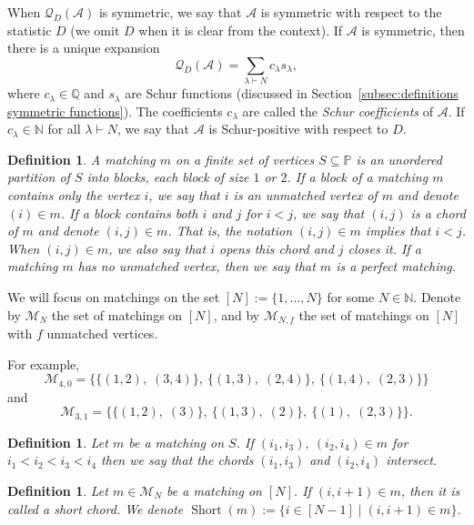 \documentclass[11pt]{article}
\newtheorem{definition}[theo]{Definition}
\theoremstyle{definition}
\numberwithin{equation}{section}
\newcommand{\Short}{\operatorname{Short}}
\newcommand{\NN}{\mathbb{N}}
\newcommand{\QQ}{\mathbb{Q}}
\newcommand{\PP}{\mathbb{P}}
\newcommand{\Q}{\mathcal{Q}}
\newcommand{\A}{\mathcal{A}}
\newcommand{\M}{\mathcal{M}}
\begin{document}
When $\Q_{D}(\A)$ is symmetric, we say that $\A$ is symmetric with respect to the statistic $D$ (we omit $D$ when it is clear from the context). If $\A$ is symmetric, then there is a unique expansion
\[
    \Q_{D} (\A) = \sum_{\lambda \vdash N} c_\lambda s_\lambda,
\]
where $c_\lambda \in \QQ$ and $s_\lambda$ are Schur functions (discussed in Section~\ref{subsec:definitions symmetric functions}). The coefficients $c_\lambda$ are called the \emph{Schur coefficients} of $\A$.
If $c_\lambda \in \NN$ for all $\lambda \vdash N$, we say that $\A$ is Schur-positive with respect to $D$.

\begin{definition}
\label{def:matching}
    A matching $m$ on a finite set of vertices $S \subseteq \PP$ is an unordered partition of $S$ into blocks, each block of size $1$ or $2$. If a block of a matching $m$ contains only the vertex $i$, we say that $i$ is an \emph{unmatched vertex} of $m$ and denote $(i) \in m$. If a block contains both $i$ and $j$ for $i<j$, we say that $(i,j)$ is a \emph{chord} of $m$ and denote $(i,j) \in m$. That is, the notation $(i,j)\in m$ implies that $i<j$. When $(i,j) \in m$, we also say that $i$ opens this chord and $j$ closes it. If a matching $m$ has no unmatched vertex, then we say that $m$ is a perfect matching.
\end{definition}

We will focus on matchings on the set $[N] := \{1,\dots, N\}$ for some $N \in \NN$. Denote by $\M_N$ the set of matchings on $[N]$, and by $\M_{N,f}$ the set of matchings on $[N]$ with $f$ unmatched vertices.

For example, 
\[
    \M_{4,0} = \big\{\{(1,2),\; (3,4)\},\ \{(1,3),\; (2,4)\},\ \{(1,4),\; (2,3)\}\big\}
\]
and
\[ 
    \M_{3,1} = \big\{\{(1,2),\; (3)\},\ \{(1,3),\; (2)\},\ \{(1),\; (2,3)\}\big\}.
\]

\begin{definition}
\label{def:intersect}
    Let $m$ be a matching on $S$. If $(i_1, i_3),\: (i_2,i_4) \in m$ for $i_1 < i_2 < i_3 < i_4$ then we say that the chords $(i_1, i_3)$ and $(i_2, i_4)$ \emph{intersect}.
\end{definition}

\begin{definition}
\label{def:short}
    Let $m \in \M_N$ be a matching on $[N]$. If $(i,i+1) \in m$, then it is called a \emph{short chord}. We denote $\Short(m) := \{i \in [N-1] \mid (i,i+1) \in m\}$.

\end{definition}
\end{document}
